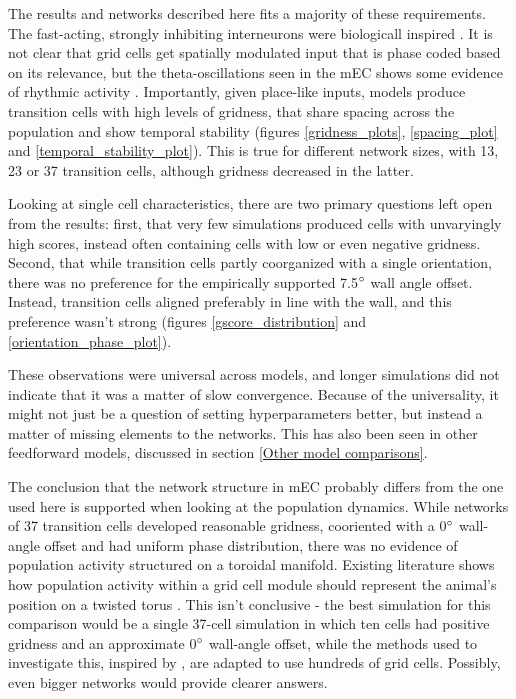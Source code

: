 \documentclass{article}
\begin{document}
    The results and networks described here fits a majority of these requirements. The fast-acting, strongly inhibiting interneurons were biologicall inspired \parencite{Couey2013,Buetfering2014}. It is not clear that grid cells get spatially modulated input that is phase coded based on its relevance, but the theta-oscillations seen in the mEC shows some evidence of rhythmic activity \parencite{Winson1978}. Importantly, given place-like inputs, models produce transition cells with high levels of gridness, that share spacing across the population and show temporal stability (figures \ref{gridness_plots}, \ref{spacing_plot} and \ref{temporal_stability_plot}). This is true for different network sizes, with 13, 23 or 37 transition cells, although gridness decreased in the latter.
    
    Looking at single cell characteristics, there are two primary questions left open from the results: first, that very few simulations produced cells with unvaryingly high scores, instead often containing cells with low or even negative gridness. Second, that while transition cells partly coorganized with a single orientation, there was no preference for the empirically supported 7.5\(\degree\) wall angle offset. Instead, transition cells aligned preferably in line with the wall, and this preference wasn't strong (figures \ref{gscore_distribution} and \ref{orientation_phase_plot}).

    These observations were universal across models, and longer simulations did not indicate that it was a matter of slow convergence. Because of the universality, it might not just be a question of setting hyperparameters better, but instead a matter of missing elements to the networks. This has also been seen in other feedforward models, discussed in section \ref{Other model comparisons}.

    The conclusion that the network structure in mEC probably differs from the one used here is supported when looking at the population dynamics. While networks of 37 transition cells developed reasonable gridness, cooriented with a 0\(\degree\) wall-angle offset and had uniform phase distribution, there was no evidence of population activity structured on a toroidal manifold. Existing literature shows how population activity within a grid cell module should represent the animal's position on a twisted torus \parencite{Gardner2022}. This isn't conclusive - the best simulation for this comparison would be a single 37-cell simulation in which ten cells had positive gridness and an approximate 0\(\degree\) wall-angle offset, while the methods used to investigate this, inspired by \cite{Gardner2022}, are adapted to use hundreds of grid cells. Possibly, even bigger networks would provide clearer answers.
\end{document}
